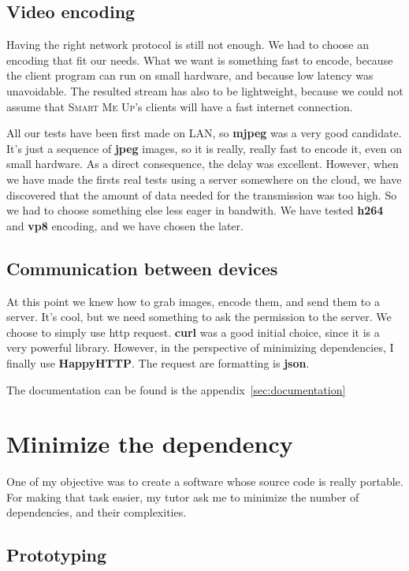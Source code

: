 \documentclass[a4paper,11pt]{custom}
\newcommand{\smu}{\textsc{Smart Me Up}\xspace}
\newcommand{\curl}{\textbf{curl}\xspace}
\newcommand{\happyhttp}{\textbf{HappyHTTP}\xspace}
\newcommand{\mjpeg}{\textbf{mjpeg}\xspace}
\newcommand{\jpeg}{\textbf{jpeg}\xspace}
\newcommand{\vpx}{\textbf{vp8}\xspace}
\newcommand{\mpeg}{\textbf{h264}\xspace}
\newcommand{\json}{\textbf{json}\xspace}
\begin{document}
\subsection{Video encoding}

Having the right network protocol is still not enough. We had to choose an
encoding that fit our needs. What we want is something fast to encode,
because the client program can run on small hardware, and because low latency
was unavoidable. The resulted stream has also to be lightweight, because we
could not assume that \smu's clients will have a fast internet connection.

All our tests have been first made on LAN, so \mjpeg{} was a very good
candidate. It's just a sequence of \jpeg{} images, so it is really, really fast
to encode it, even on small hardware. As a direct consequence, the delay was
excellent. However, when we have made the firsts real tests using a server
somewhere on the cloud, we have discovered that the amount of data needed for the
transmission was too high. So we had to choose something else less eager in
bandwith. We have tested \mpeg{} and \vpx encoding, and we have chosen the later.

\subsection{Communication between devices}
\label{sec:communication}

At this point we knew how to grab images, encode them, and send them to a
server. It's cool, but we need something to ask the permission to the server. We
choose to simply use http request. \curl{} was a good initial choice, since it
is a very powerful library. However, in the perspective of minimizing dependencies,
I finally use \happyhttp. The request are formatting is \json.

The documentation can be found is the appendix~\ref{sec:documentation}

\section{Minimize the dependency}

One of my objective was to create a software whose source code is really
portable. For making that task easier, my tutor ask me to minimize the number of
dependencies, and their complexities.

\subsection{Prototyping}
\end{document}
